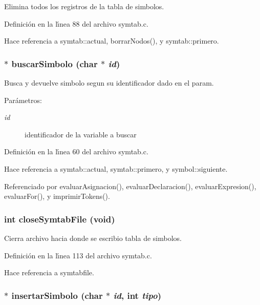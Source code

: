 Elimina todos los registros de la tabla de simbolos. 



Definici\'{o}n en la l\'{\i}nea 88 del archivo symtab.c.

Hace referencia a symtab::actual, borrar\-Nodos(), y symtab::primero.
\subsubsection{$\ast$ buscar\-Simbolo (char $\ast$ {\em id})}\label{symtab_8c_a3}


Busca y devuelve simbolo segun su identificador dado en el param. 

\begin{Desc}
\item[Par\'{a}metros:]
\begin{description}
\item[{\em id}]identificador de la variable a buscar \end{description}
\end{Desc}


Definici\'{o}n en la l\'{\i}nea 60 del archivo symtab.c.

Hace referencia a symtab::actual, symtab::primero, y symbol::siguiente.

Referenciado por evaluar\-Asignacion(), evaluar\-Declaracion(), evaluar\-Expresion(), evaluar\-For(), y imprimir\-Tokens().
\subsubsection{\setlength{\rightskip}{0pt plus 5cm}int close\-Symtab\-File (void)}\label{symtab_8c_a7}


Cierra archivo hacia donde se escribio tabla de simbolos. 



Definici\'{o}n en la l\'{\i}nea 113 del archivo symtab.c.

Hace referencia a symtabfile.
\subsubsection{$\ast$ insertar\-Simbolo (char $\ast$ {\em id}, int {\em tipo})}\label{symtab_8c_a2}


